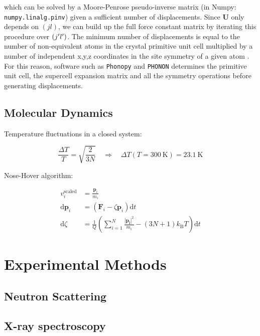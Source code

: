 \noindent which can be solved by a Moore-Penrose pseudo-inverse matrix (in Numpy: \texttt{numpy.linalg.pinv}) given a sufficient number of displacements. Since $\bm{U}$ only depends on $(jl)$, we can build up the full force constant matrix by iterating this procedure over $(j^\prime l^\prime)$. The minimum number of displacements is equal to the number of non-equivalent atoms in the crystal primitive unit cell multiplied by a number of independent x,y,z coordinates in the site symmetry of a given atom \cite{Parlinski1997}. For this reason, software such as \texttt{Phonopy} and \texttt{PHONON} determines the primitive unit cell, the supercell expansion matrix and all the symmetry operations before generating displacements.

\section{Molecular Dynamics}
Temperature fluctuations in a closed system:

\[ \frac{\Delta T}{T} = \sqrt{\frac{2}{3N}} \quad \Rightarrow \quad \Delta T(T=\SI{300}{\kelvin}) = \SI{23.1}{\kelvin} \]

\noindent Nose-Hover algorithm:

\begin{align*}
v_i^\text{scaled} &= \frac{\bm{p}_i}{m_i} \\
\text{d}\bm{p}_i &= (\bm{F}_i - \zeta \bm{p}_i) \text{d}t \\
\text{d}\zeta &= \frac{1}{Q} \left( \sum_{i=1}^N \frac{|\bm{p_i}|^2}{m_i} - (3N+1)k_\text{B}T\right) \text{d}t
\end{align*}

\chapter{Experimental Methods}
\section{Neutron Scattering}
\section{X-ray spectroscopy}